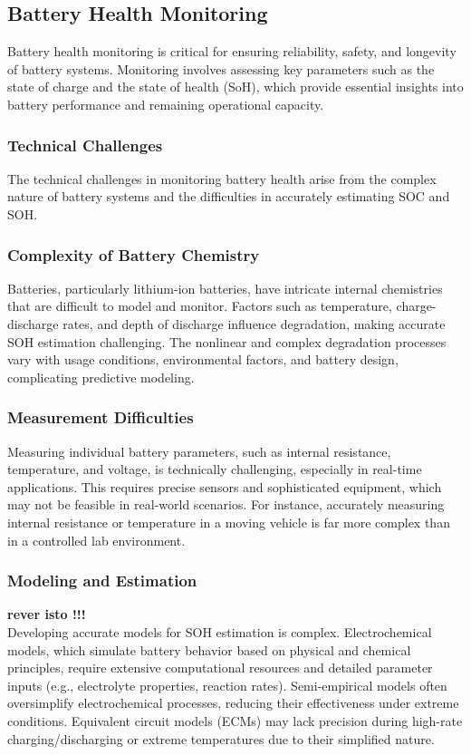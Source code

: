 \subsection{Battery Health Monitoring}
Battery health monitoring is critical for ensuring reliability, safety, and longevity of battery systems. Monitoring involves assessing key parameters such as the state of charge and the state of health (SoH), which provide essential insights into battery performance and remaining operational capacity.
\subsubsection{Technical Challenges}
The technical challenges in monitoring battery health arise from the complex nature of battery systems and the difficulties in accurately estimating SOC and SOH.

\subsubsection{Complexity of Battery Chemistry}
Batteries, particularly lithium-ion batteries, have intricate internal chemistries that are difficult to model and monitor.
Factors such as temperature, charge-discharge rates, and depth of discharge influence degradation, making accurate SOH estimation challenging. 
The nonlinear and complex degradation processes vary with usage conditions, environmental factors, and battery design, complicating predictive modeling.

\subsubsection{Measurement Difficulties}
Measuring individual battery parameters, such as internal resistance, temperature, and voltage, is technically challenging, especially in real-time applications. 
This requires precise sensors and sophisticated equipment, which may not be feasible in real-world scenarios. 
For instance, accurately measuring internal resistance or temperature in a moving vehicle is far more complex than in a controlled lab environment.

\subsubsection{Modeling and Estimation}
\textbf{rever isto !!!} \\
Developing accurate models for SOH estimation is complex. 
Electrochemical models, which simulate battery behavior based on physical and chemical principles, require extensive computational resources and detailed parameter inputs (e.g., electrolyte properties, reaction rates). 
Semi-empirical models often oversimplify electrochemical processes, reducing their effectiveness under extreme conditions. Equivalent circuit models (ECMs) may lack precision during high-rate charging/discharging or extreme temperatures due to their simplified nature.

